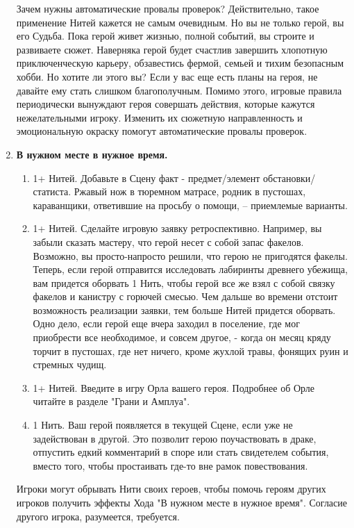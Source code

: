 \begin{enumerate}
    \begin{tcolorbox}
        Зачем нужны автоматические провалы проверок? Действительно, такое применение Нитей кажется не самым очевидным. Но вы не только герой, вы его Судьба. Пока герой живет жизнью, полной событий, вы строите и развиваете сюжет. Наверняка герой будет счастлив завершить хлопотную приключенческую карьеру, обзавестись фермой, семьей и тихим безопасным хобби. Но хотите ли этого вы? Если у вас еще есть планы на героя, не давайте ему стать слишком благополучным.
        \newline Помимо этого, игровые правила периодически вынуждают героя совершать действия, которые кажутся нежелательными игроку. Изменить их сюжетную направленность и эмоциональную окраску помогут автоматические провалы проверок.
    \end{tcolorbox}

    \item \textbf{В нужном месте в нужное время.}
    \begin{enumerate}
        \item 1+ Нитей. Добавьте в Сцену факт - предмет/элемент обстановки/статиста. Ржавый нож в тюремном матрасе, родник в пустошах, караванщики, ответившие на просьбу о помощи, – приемлемые варианты. 
        \item 1+ Нитей. Сделайте игровую заявку ретроспективно. Например, вы забыли сказать мастеру, что герой несет с собой запас факелов. Возможно, вы просто-напросто решили, что герою не пригодятся факелы. Теперь, если герой отправится исследовать лабиринты древнего убежища, вам придется оборвать 1 Нить, чтобы герой все же взял с собой связку факелов и канистру с горючей смесью.
        \newline Чем дальше во времени отстоит возможность реализации заявки, тем больше Нитей придется оборвать. Одно дело, если герой еще вчера заходил в поселение, где мог приобрести все необходимое, и совсем другое, - когда он месяц кряду торчит в пустошах, где нет ничего, кроме жухлой травы, фонящих руин и стремных чудищ.
        \item 1+ Нитей. Введите в игру Орла вашего героя. Подробнее об Орле читайте в разделе "Грани и Амплуа".
        \item 1 Нить. Ваш герой появляется в текущей Сцене, если уже не задействован в другой. Это позволит герою поучаствовать в драке, отпустить едкий комментарий в споре или стать свидетелем события, вместо того, чтобы простаивать где-то вне рамок повествования.
    \end{enumerate}
    \begin{tcolorbox}
        Игроки могут обрывать Нити своих героев, чтобы помочь героям других игроков получить эффекты Хода "В нужном месте в нужное время". Согласие другого игрока, разумеется, требуется.
    \end{tcolorbox}


\end{enumerate}
